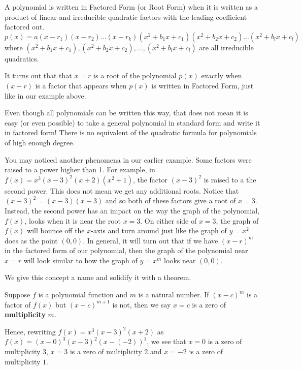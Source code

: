 \documentclass{ximera}
\begin{document}
\begin{definition}
A polynomial is written in Factored Form (or Root Form) when it is written as a product of linear and irreducible quadratic factors with the leading coefficient factored out.
$$p(x)=a(x-r_1)(x-r_2)...(x-r_k)(x^2+b_1x+c_1)(x^2+b_2x+c_2)...(x^2+b_lx+c_l)$$
where $(x^2+b_1x+c_1),(x^2+b_2x+c_2),...,(x^2+b_lx+c_l)$ are all irreducible quadratics.
\end{definition}

It turns out that that $x=r$ is a root of the polynomial $p(x)$ exactly when $(x-r)$ is a factor that appears when $p(x)$ is written in Factored Form, just like in our example above.

\begin{remark}
Even though all polynomials can be written this way, that does not mean it is easy (or even possible) to take a general polynomial in standard form and write it in factored form!  There is no equivalent of the quadratic formula for polynomials of high enough degree.
\end{remark}

You may noticed another phenomena in our earlier example.  Some factors were raised to a power higher than 1.  For example, in $f(x) = x^3 (x-3)^2 (x+2) \left(x^2+1\right)$, the factor $(x-3)^2$ is raised to a the second power.  This does not mean we get any additional roots.  Notice that $(x-3)^2=(x-3)(x-3)$ and so both of these factors give a root of $x=3$.  Instead, the second power has an impact on the way the graph of the polynomial, $f(x)$, looks when it is near the root $x=3$.  On either side of $x=3$, the graph of $f(x)$ will bounce off the $x$-axis and turn around just like the graph of $y=x^2$ does as the point $(0,0)$.  In general, it will turn out that if we have $(x-r)^m$ in the factored form of our polynomial, then the graph of the polynomial near $x=r$ will look similar to how the graph of $y=x^m$ looks near $(0,0)$.  

We give this concept a name and solidify it with a theorem.  

\begin{definition}
Suppose $f$ is a polynomial function and $m$ is a natural number. If $(x-c)^{m}$ is a factor of $f(x)$ but $(x-c)^{m+1}$ is not, then we say $x=c$ is a zero of \textbf{multiplicity} $m$.
\end{definition}

Hence,  rewriting  $f(x) = x^3 (x-3)^2 (x+2)$ as $f(x) = (x-0)^3 (x-3)^2 (x-(-2))^{1}$, we see that $x=0$ is a zero of multiplicity $3$, $x=3$ is a zero of multiplicity $2$ and $x=-2$ is a zero of multiplicity $1$.
\end{document}
